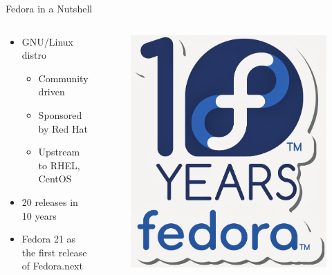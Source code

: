 \documentclass{beamer}
\begin{document}
\begin{frame}{Fedora in a Nutshell}
  \begin{columns}
    \begin{column}{.5\textwidth}
  \begin{itemize}
    \item GNU/Linux distro
      \begin{itemize}
        \item Community driven
        \item Sponsored by Red Hat
        \item Upstream to RHEL, CentOS
      \end{itemize}
    \item 20 releases in 10 years
    \item Fedora 21 as the first release of Fedora.next
  \end{itemize}
    \end{column}
    \begin{column}{.5\textwidth}
      \begin{figure}[htbp]
        \centering
        \includegraphics[width=.6\textwidth]{tenyears.jpeg}
      \end{figure}
    \end{column}
  \end{columns}
\end{frame}
\end{document}
